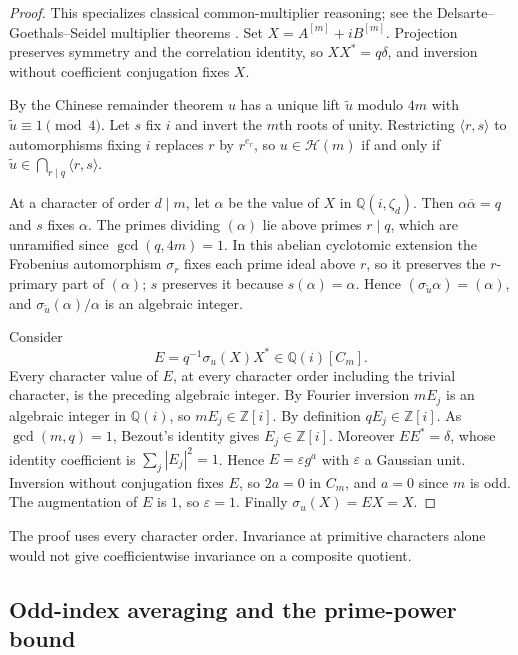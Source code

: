 \documentclass[11pt]{article}
\theoremstyle{definition}
\theoremstyle{remark}
\begin{document}
\begin{proof}
This specializes classical common-multiplier reasoning; see the
Delsarte--Goethals--Seidel multiplier theorems
\cite[Theorems~5.2--5.4]{DGS71}. Set $X=A^{[m]}+iB^{[m]}$. Projection
preserves symmetry and the correlation identity, so $XX^*=q\delta$, and
inversion without coefficient conjugation fixes $X$.

By the Chinese remainder theorem $u$ has a unique lift $\widetilde u$
modulo $4m$ with $\widetilde u\equiv1\pmod4$. Let $s$ fix $i$ and invert
the $m$th roots of unity. Restricting $\langle r,s\rangle$ to
automorphisms fixing $i$ replaces $r$ by $r^{e_r}$, so $u\in\mathcal H(m)$
if and only if $\widetilde u\in\bigcap_{r\mid q}\langle r,s\rangle$.

At a character of order $d\mid m$, let $\alpha$ be the value of $X$ in
$\mathbb Q(i,\zeta_d)$. Then $\alpha\overline\alpha=q$ and $s$ fixes
$\alpha$. The primes dividing $(\alpha)$ lie above primes $r\mid q$, which
are unramified since $\gcd(q,4m)=1$. In this abelian cyclotomic extension
the Frobenius automorphism $\sigma_r$ fixes each prime ideal above $r$, so
it preserves the $r$-primary part of $(\alpha)$; $s$ preserves it because
$s(\alpha)=\alpha$. Hence $(\sigma_{\widetilde u}\alpha)=(\alpha)$, and
$\sigma_{\widetilde u}(\alpha)/\alpha$ is an algebraic integer.

Consider
\[
 E=q^{-1}\sigma_u(X)X^*\in\mathbb Q(i)[C_m].
\]
Every character value of $E$, at every character order including the
trivial character, is the preceding algebraic integer. By Fourier
inversion $mE_j$ is an algebraic integer in $\mathbb Q(i)$, so
$mE_j\in\mathbb Z[i]$. By definition $qE_j\in\mathbb Z[i]$. As
$\gcd(m,q)=1$, Bezout's identity gives $E_j\in\mathbb Z[i]$. Moreover
$EE^*=\delta$, whose identity coefficient is $\sum_j|E_j|^2=1$. Hence
$E=\varepsilon g^a$ with $\varepsilon$ a Gaussian unit. Inversion without
conjugation fixes $E$, so $2a=0$ in $C_m$, and $a=0$ since $m$ is odd. The
augmentation of $E$ is $1$, so $\varepsilon=1$. Finally
$\sigma_u(X)=EX=X$.
\end{proof}

The proof uses every character order. Invariance at primitive characters
alone would not give coefficientwise invariance on a composite quotient.

\subsection{Odd-index averaging and the prime-power bound}
\label{early-averaging}
\end{document}
